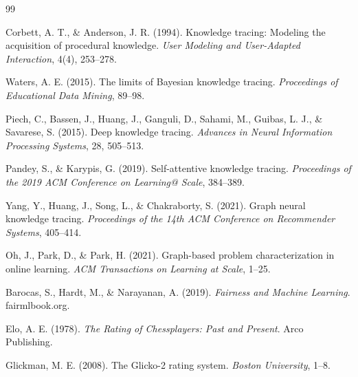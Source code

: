 \documentclass[conference]{IEEEtran}
\begin{document}
\begin{thebibliography}{99}

Corbett, A. T., \& Anderson, J. R. (1994). Knowledge tracing: Modeling the acquisition of procedural knowledge. \emph{User Modeling and User-Adapted Interaction}, 4(4), 253--278.

Waters, A. E. (2015). The limits of Bayesian knowledge tracing. \emph{Proceedings of Educational Data Mining}, 89--98.

Piech, C., Bassen, J., Huang, J., Ganguli, D., Sahami, M., Guibas, L. J., \& Savarese, S. (2015). Deep knowledge tracing. \emph{Advances in Neural Information Processing Systems}, 28, 505--513.

Pandey, S., \& Karypis, G. (2019). Self-attentive knowledge tracing. \emph{Proceedings of the 2019 ACM Conference on Learning@ Scale}, 384--389.

Yang, Y., Huang, J., Song, L., \& Chakraborty, S. (2021). Graph neural knowledge tracing. \emph{Proceedings of the 14th ACM Conference on Recommender Systems}, 405--414.

Oh, J., Park, D., \& Park, H. (2021). Graph-based problem characterization in online learning. \emph{ACM Transactions on Learning at Scale}, 1--25.

Barocas, S., Hardt, M., \& Narayanan, A. (2019). \emph{Fairness and Machine Learning}. fairmlbook.org.

Elo, A. E. (1978). \emph{The Rating of Chessplayers: Past and Present}. Arco Publishing.

Glickman, M. E. (2008). The Glicko-2 rating system. \emph{Boston University}, 1--8.

\end{thebibliography}
\end{document}
